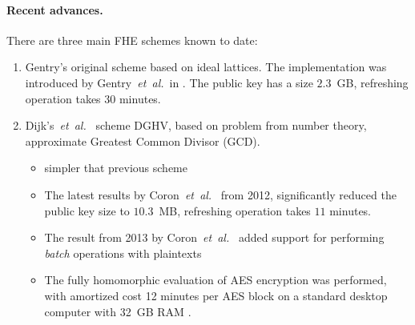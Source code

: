 \documentclass[11pt,oneside,final]{fithesis2}
\newcommand{\eal}{\emph{et~al.}}
\begin{document}
    \paragraph*{Recent advances.} 
    There are three main FHE schemes known to date:
    \begin{enumerate}
     \item Gentry's original scheme based on ideal lattices. The implementation was introduced 
	by Gentry~\eal\ in \citep{Gentry:2011:IGF:2008684.2008697}. The public key has a size $2.3$~GB, refreshing operation takes 30 minutes.

    \item Dijk's~\eal\ \citep{vanDijk:2010:FHE:2163822.2163825} scheme DGHV, based on problem from number theory, approximate Greatest Common Divisor (GCD).
	\begin{itemize}
	 \item simpler that previous scheme
	 \item The latest results by Coron~\eal\ \citep{Coron:2012:PKC:2260849.2260886} from 2012, significantly reduced the public key size
	to $10.3$~MB, refreshing operation takes $11$ minutes.
	 \item The result from 2013 by Coron~\eal\ \citep{DBLP:journals/iacr/CoronLT13} 
 	added support for performing \emph{batch} operations with plaintexts%
	\item The fully homomorphic evaluation of AES encryption was performed, with amortized cost 12 minutes per 
	AES block on a standard desktop computer with 32~GB RAM \citep{DBLP:journals/iacr/CoronLT13} .
	\end{itemize}
% 


\end{enumerate}
\end{document}
